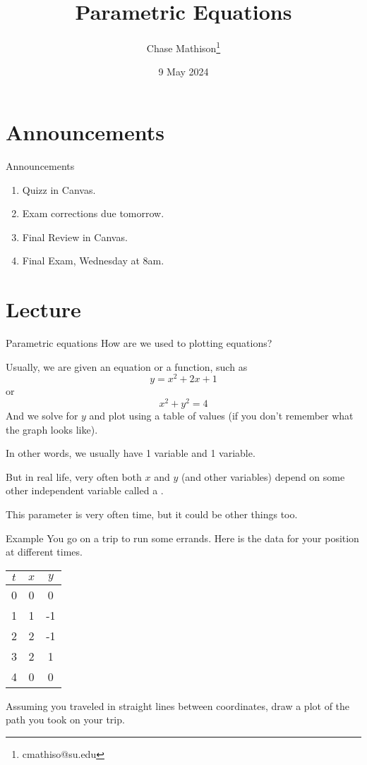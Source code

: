 \documentclass[presentation]{beamer}
\institute[SU]{Shenandoah University}
\author{Chase Mathison\thanks{cmathiso@su.edu}}
\date{9 May 2024}
\title{Parametric Equations}
\begin{document}
\maketitle

\section{Announcements}
\label{sec:org96cc938}
\begin{frame}[label={sec:org72d1bab}]{Announcements}
\begin{enumerate}
\item Quizz in Canvas.
\item Exam corrections due tomorrow.
\item Final Review in Canvas.
\item Final Exam, Wednesday at 8am.
\end{enumerate}
\end{frame}

\section{Lecture}
\label{sec:orgb36e4b8}
\begin{frame}[label={sec:org4431e78}]{Parametric equations}
How are we used to plotting equations?  

Usually, we are given an equation or a function, such as
\[
y = x^2 + 2x + 1 \]
or
\[
x^2 + y^2 = 4 \]
And we solve for \(y\) and plot using a table of values (if you don't
remember what the graph looks like).  

In other words, we usually have 1 \uline{\hspace*{1in}} variable and 1
\uline{\hspace*{1in}} variable.


But in real life, very often both \(x\) and \(y\) (and other
variables) depend on some other independent variable called a
\uline{\hspace*{1in}}.

This parameter is very often time, but it could be other things too.
\end{frame}

\begin{frame}[label={sec:org4e58c15}]{Example}
You go on a trip to run some errands.  Here is the data for your
position at different times.

\begin{center}
\begin{tabular}{|c|c|c|}
\hline
\(t\) & \(x\) & \(y\)\\
\hline
0 & 0 & 0\\
1 & 1 & -1\\
2 & 2 & -1\\
3 & 2 & 1\\
4 & 0 & 0\\
\hline
\end{tabular}
\end{center}

Assuming you traveled in straight lines between coordinates, draw a
plot of the path you took on your trip.

\vspace{10in}
\end{frame}
\end{document}
